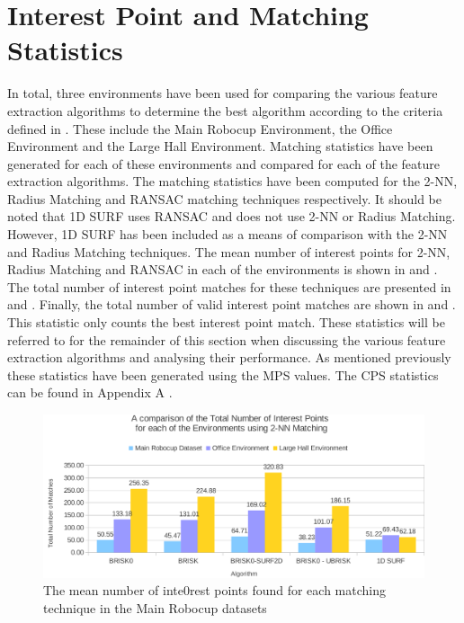 \section{Interest Point and Matching Statistics}
\label{sec:matchingStats}
In total, three environments have been used for comparing the various feature extraction algorithms to determine the best algorithm according to the criteria defined in . These include the Main Robocup Environment, the Office Environment and the Large Hall Environment. Matching statistics have been generated for each of these environments and compared for each of the feature extraction algorithms. The matching statistics have been computed for the 2-NN, Radius Matching and RANSAC matching techniques respectively. It should be noted that 1D SURF uses RANSAC and does not use 2-NN or Radius Matching. However, 1D SURF has been included as a means of comparison with the 2-NN and Radius Matching techniques. The mean number of interest points for 2-NN, Radius Matching and RANSAC in each of the environments is shown in  and . The total number of interest point matches for these techniques are presented in  and . Finally, the total number of valid interest point matches are shown in  and . This statistic only counts the best interest point match. These statistics will be referred to for the remainder of this section when discussing the various feature extraction algorithms and analysing their performance. As mentioned previously these statistics have been generated using the MPS values. The CPS statistics can be found in Appendix A .\\

 \begin{figure}%
  \centering
    \includegraphics[width=1.0\textwidth]{../Drawings/Graphs/overall_tn_ip.pdf}
    \caption{The mean number of inte0rest points found for each matching technique in the Main Robocup datasets} 
    \label{fig:overall_tn_ip}
 \end{figure}
 
